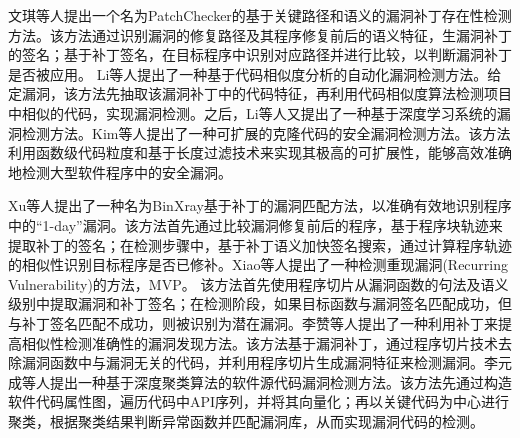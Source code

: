文琪等人\cite{8文琪2020}提出一个名为PatchChecker的基于关键路径和语义的漏洞补丁存在性检测方法。该方法通过识别漏洞的修复路径及其程序修复前后的语义特征，生漏洞补丁的签名；基于补丁签名，在目标程序中识别对应路径并进行比较，以判断漏洞补丁是否被应用。%
Li等人\cite{li2016vulpecker}提出了一种基于代码相似度分析的自动化漏洞检测方法。给定漏洞，该方法先抽取该漏洞补丁中的代码特征，再利用代码相似度算法检测项目中相似的代码，实现漏洞检测。之后，Li等人\cite{li2018vuldeepecker}又提出了一种基于深度学习系统的漏洞检测方法。Kim等人\cite{kim2017vuddy}提出了一种可扩展的克隆代码的安全漏洞检测方法。该方法利用函数级代码粒度和基于长度过滤技术来实现其极高的可扩展性，能够高效准确地检测大型软件程序中的安全漏洞。

Xu等人\cite{xu2020patch}提出了一种名为BinXray基于补丁的漏洞匹配方法，以准确有效地识别程序中的“1-day”漏洞。该方法首先通过比较漏洞修复前后的程序，基于程序块轨迹来提取补丁的签名；在检测步骤中，基于补丁语义加快签名搜索，通过计算程序轨迹的相似性识别目标程序是否已修补。Xiao等人\cite{xiao2020mvp}提出了一种检测重现漏洞(Recurring Vulnerability)的方法，MVP。 该方法首先使用程序切片从漏洞函数的句法及语义级别中提取漏洞和补丁签名；在检测阶段，如果目标函数与漏洞签名匹配成功，但与补丁签名匹配不成功，则被识别为潜在漏洞。李赞等人\cite{22李赞2018}提出了一种利用补丁来提高相似性检测准确性的漏洞发现方法。该方法基于漏洞补丁，通过程序切片技术去除漏洞函数中与漏洞无关的代码，并利用程序切片生成漏洞特征来检测漏洞。李元成等人\cite{23李元诚2020}提出一种基于深度聚类算法的软件源代码漏洞检测方法。该方法先通过构造软件代码属性图，遍历代码中API序列，并将其向量化；再以关键代码为中心进行聚类，根据聚类结果判断异常函数并匹配漏洞库，从而实现漏洞代码的检测。


